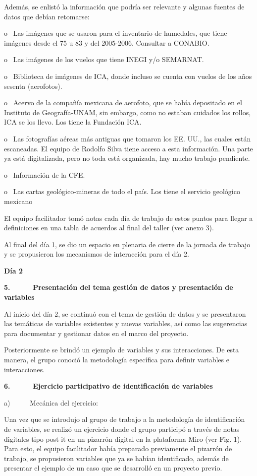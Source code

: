 \documentclass[
  letterpaper,
  DIV=11,
  numbers=noendperiod]{scrreprt}
\begin{document}
Además, se enlistó la información que podría ser relevante y algunas
fuentes de datos que debían retomarse:

o~ Las imágenes que se usaron para el inventario de humedales, que tiene
imágenes desde el 75 u 83 y del 2005-2006. Consultar a CONABIO.

o~ Las imágenes de los vuelos que tiene INEGI y/o SEMARNAT.

o~ Biblioteca de imágenes de ICA, donde incluso se cuenta con vuelos de
los años sesenta (aerofotos).

o~ Acervo de la compañía mexicana de aerofoto, que se había depositado
en el Instituto de Geografía-UNAM, sin embargo, como no estaban cuidados
los rollos, ICA se los llevo. Los tiene la Fundación ICA.

o~ Las fotografías aéreas más antiguas que tomaron los EE. UU., las
cuales están escaneadas. El equipo de Rodolfo Silva tiene acceso a esta
información. Una parte ya está digitalizada, pero no toda está
organizada, hay mucho trabajo pendiente.

o~ Información de la CFE.

o~ Las cartas geológico-mineras de todo el país. Los tiene el servicio
geológico mexicano

El equipo facilitador tomó notas cada día de trabajo de estos puntos
para llegar a definiciones en una tabla de acuerdos al final del taller
(ver anexo 3).

Al final del día 1, se dio un espacio en plenaria de cierre de la
jornada de trabajo y se propusieron los mecanismos de interacción para
el día 2.

\textbf{Día 2}

\textbf{5.~~~~~ Presentación del tema gestión de datos y presentación de
variables}

Al inicio del día 2, se continuó con el tema de gestión de datos y se
presentaron las temáticas de variables existentes y nuevas variables,
así como las sugerencias para documentar y gestionar datos en el marco
del proyecto.

Posteriormente se brindó un ejemplo de variables y sus interacciones. De
esta manera, el grupo conoció la metodología específica para definir
variables e interacciones.

\textbf{6.~~~~~ Ejercicio participativo de identificación de variables}

a)~~~~~ Mecánica del ejercicio:

Una vez que se introdujo al grupo de trabajo a la metodología de
identificación de variables, se realizó un ejercicio donde el grupo
participó a través de notas digitales tipo post-it en un pizarrón
digital en la plataforma Miro (ver Fig. 1). Para esto, el equipo
facilitador había preparado previamente el pizarrón de trabajo, se
propusieron variables que ya se habían identificado, además de presentar
el ejemplo de un caso que se desarrolló en un proyecto previo.
\end{document}
